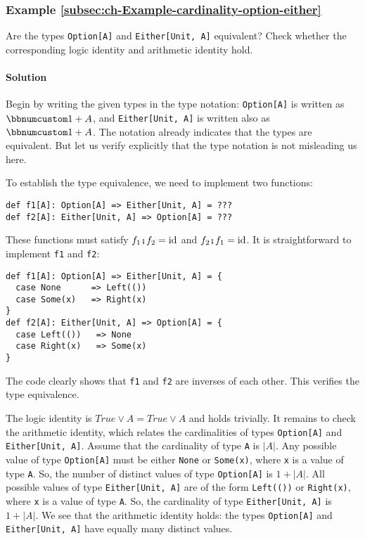 \subsubsection{Example \label{subsec:ch-Example-cardinality-option-either}\ref{subsec:ch-Example-cardinality-option-either}}

Are the types \lstinline!Option[A]! and \lstinline!Either[Unit, A]!
equivalent? Check whether the corresponding logic identity and arithmetic
identity hold.

\paragraph{Solution}

Begin by writing the given types in the type notation: \lstinline!Option[A]!
is written as $\bbnum 1+A$, and \lstinline!Either[Unit, A]! is written
also as $\bbnum 1+A$. The notation already indicates that the types
are equivalent. But let us verify explicitly that the type notation
is not misleading us here.

To establish the type equivalence, we need to implement two functions:
\begin{lstlisting}
def f1[A]: Option[A] => Either[Unit, A] = ???
def f2[A]: Either[Unit, A] => Option[A] = ???
\end{lstlisting}
These functions must satisfy $f_{1}\bef f_{2}=\text{id}$ and $f_{2}\bef f_{1}=\text{id}$.
It is straightforward to implement \lstinline!f1! and \lstinline!f2!:
\begin{lstlisting}
def f1[A]: Option[A] => Either[Unit, A] = {
  case None      => Left(())
  case Some(x)   => Right(x)
}
def f2[A]: Either[Unit, A] => Option[A] = {
  case Left(())   => None
  case Right(x)   => Some(x)
}
\end{lstlisting}
The code clearly shows that \lstinline!f1! and \lstinline!f2! are
inverses of each other. This verifies the type equivalence.

The logic identity is $True\vee A=True\vee A$ and holds trivially.
It remains to check the arithmetic identity, which relates the cardinalities
of types \lstinline!Option[A]! and \lstinline!Either[Unit, A]!.
Assume that the cardinality of type \lstinline!A! is $\left|A\right|$.
Any possible value of type \lstinline!Option[A]! must be either \lstinline!None!
or \lstinline!Some(x)!, where \lstinline!x! is a value of type \lstinline!A!.
So, the number of distinct values of type \lstinline!Option[A]! is
$1+\left|A\right|$. All possible values of type \lstinline!Either[Unit, A]!
are of the form \lstinline!Left(())! or \lstinline!Right(x)!, where
\lstinline!x! is a value of type \lstinline!A!. So, the cardinality
of type \lstinline!Either[Unit, A]! is $1+\left|A\right|$. We see
that the arithmetic identity holds: the types \lstinline!Option[A]!
and \lstinline!Either[Unit, A]! have equally many distinct values.

